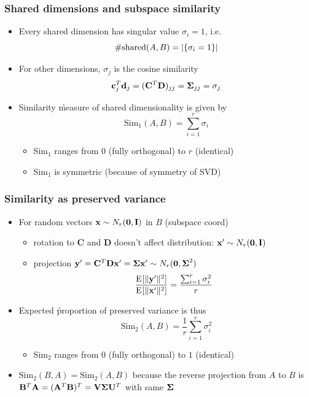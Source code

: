 \documentclass[t]{beamer} %
\begin{document}
\begin{frame}
  \frametitle{Shared dimensions and subspace similarity}

  \begin{itemize}
  \item Every shared dimension has singular value $\sigma_i = 1$, i.e.
    \[
      \#\text{shared}(A, B) = \lvert \{\sigma_i = 1\}\rvert
    \]
  \item For other dimensions, $\sigma_j$ is the cosine similarity
    \[
      \vc_j^T \vd_j = (\mathbf{C}^T \mathbf{D})_{jj} = \Msigma_{jj} = \sigma_j
    \]
  \item Similarity \h{measure of shared dimensionality} is given by
    \[
      \text{Sim}_1(A, B) = \sum_{i=1}^r \sigma_i
    \]
    \begin{itemize}
    \item[\hand] Sim$_1$ ranges from $0$ (fully orthogonal) to $r$ (identical)
    \item[\hand] Sim$_1$ is symmetric (because of symmetry of SVD)
    \end{itemize}
  \end{itemize}
\end{frame}

\begin{frame}
  \frametitle{Similarity as preserved variance}

  \begin{itemize}
  \item For random vectors $\vx \sim N_r(\vnull, \mathbf{I})$ in $B$ (subspace coord)
    \begin{itemize}
    \item rotation to $\mathbf{C}$ and $\mathbf{D}$ doesn't affect distribution:
      $\vx' \sim N_r(\vnull, \mathbf{I})$
    \item projection $\vy' = \mathbf{C}^T \mathbf{D} \vx' = \Msigma \vx' \sim N_r(\vnull, \Msigma^2)$
      \[
        \frac{ \Exp{\norm{\vy'}^2} }{ \Exp{\norm{\vx'}^2} }
        = \frac{ \sum_{i=1}^r \sigma_i^2 }{ r }
      \]
    \end{itemize}
  \item Expected \h{proportion of preserved variance} is thus
    \[
      \text{Sim}_2(A, B) = \frac1r \sum_{i=1}^r \sigma_i^2
    \]
    \begin{itemize}
    \item[\hand] Sim$_2$ ranges from $0$ (fully orthogonal) to $1$ (identical)
    \end{itemize}
  \item $\text{Sim}_2(B, A) = \text{Sim}_2(A, B)$ because the reverse projection  from $A$ to $B$ is
    $\mathbf{B}^T\mathbf{A} = (\mathbf{A}^T\mathbf{B})^T = \mathbf{V}\boldsymbol{\Sigma}\mathbf{U}^T$ with same $\boldsymbol{\Sigma}$
  \end{itemize}  
\end{frame}
\end{document}

